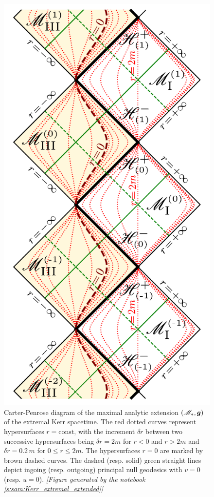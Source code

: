 \begin{figure}
\centerline{\includegraphics[height=0.7\textheight]{exk_CPdiag_maximal.pdf}}
\caption[]{\label{f:exk:CPdiag_maximal} \footnotesize
Carter-Penrose diagram of the maximal analytic extension $(\mathscr{M}_*,\bm{g})$
of the extremal Kerr spacetime.
The red dotted curves represent hypersurfaces $r=\mathrm{const}$,
with the increment $\delta r$ between two successive hypersurfaces being
$\delta r = 2m$ for $r<0$ and $r> 2m$ and $\delta r = 0.2\, m$ for $0\leq r \leq 2m$.
The hypersurfaces $r=0$ are marked by brown dashed curves.
The dashed (resp. solid) green straight lines depict ingoing (resp. outgoing)
principal null geodesics with $v=0$ (resp. $u=0$).
\textsl{[Figure generated by the notebook \ref{s:sam:Kerr_extremal_extended}]}
}
\end{figure}

